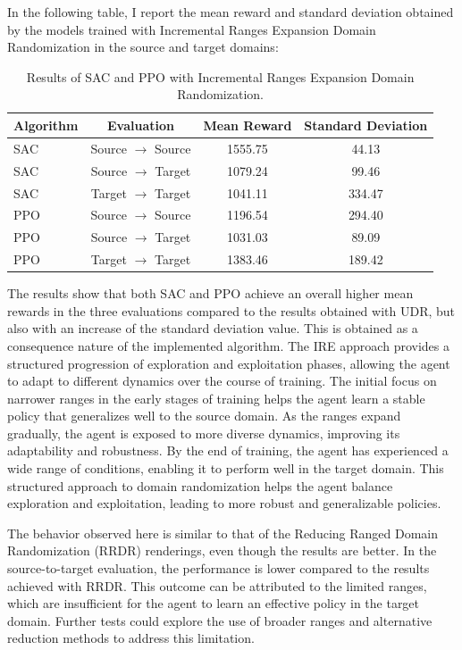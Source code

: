 \documentclass[12pt]{article}
\begin{document}
In the following table, I report the mean reward and standard deviation obtained by the models trained with Incremental Ranges Expansion Domain Randomization in the source and target domains:

\begin{table}[H]
    \centering
    \begin{tabular}{|l|c|c|c|}
        \hline
        \textbf{Algorithm} & \textbf{Evaluation} & \textbf{Mean Reward} & \textbf{Standard Deviation} \\ \hline
        SAC & Source $\rightarrow$ Source & 1555.75 & 44.13 \\ 
        SAC & Source $\rightarrow$ Target & 1079.24 & 99.46 \\ 
        SAC & Target $\rightarrow$ Target & 1041.11 & 334.47 \\ \hline
        PPO & Source $\rightarrow$ Source & 1196.54 & 294.40 \\ 
        PPO & Source $\rightarrow$ Target & 1031.03 & 89.09 \\ 
        PPO & Target $\rightarrow$ Target & 1383.46 & 189.42 \\ \hline
    \end{tabular}
    \caption{Results of SAC and PPO with Incremental Ranges Expansion Domain Randomization.}
    \label{tab:results_ire}
\end{table}

The results show that both SAC and PPO achieve an overall higher mean rewards in the three evaluations compared to the results obtained with UDR, but also with an increase of the standard deviation value. This is obtained as a consequence  nature of the implemented algorithm. The IRE approach provides a structured progression of exploration and exploitation phases, allowing the agent to adapt to different dynamics over the course of training. The initial focus on narrower ranges in the early stages of training helps the agent learn a stable policy that generalizes well to the source domain. As the ranges expand gradually, the agent is exposed to more diverse dynamics, improving its adaptability and robustness. By the end of training, the agent has experienced a wide range of conditions, enabling it to perform well in the target domain. This structured approach to domain randomization helps the agent balance exploration and exploitation, leading to more robust and generalizable policies.

The behavior observed here is similar to that of the Reducing Ranged Domain Randomization (RRDR) renderings, even though the results are better. In the source-to-target evaluation, the performance is lower compared to the results achieved with RRDR. This outcome can be attributed to the limited ranges, which are insufficient for the agent to learn an effective policy in the target domain. Further tests could explore the use of broader ranges and alternative reduction methods to address this limitation.
\end{document}

